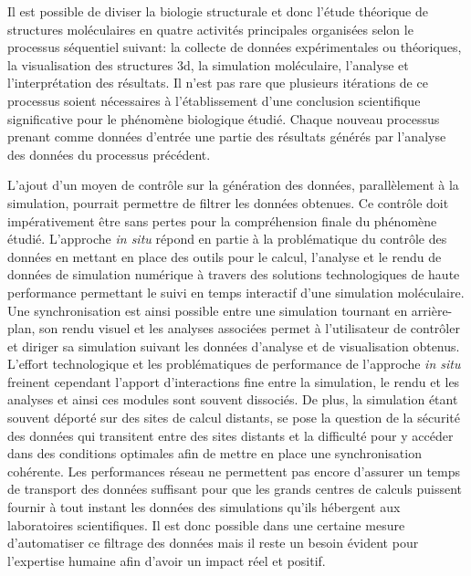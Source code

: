 Il est possible de diviser la biologie structurale et donc l'étude théorique de structures moléculaires en quatre activités principales organisées selon le processus séquentiel suivant: la collecte de données expérimentales ou théoriques, la visualisation des structures 3d, la simulation moléculaire, l’analyse et l’interprétation des résultats. Il n'est pas rare que plusieurs itérations de ce processus soient nécessaires à l'établissement d'une conclusion scientifique significative pour le phénomène biologique étudié. Chaque nouveau processus prenant comme données d'entrée une partie des résultats générés par l'analyse des données du processus précédent.  

L'ajout d'un moyen de contrôle sur la génération des données, parallèlement à la simulation, pourrait permettre de filtrer les données obtenues. Ce contrôle doit impérativement être sans pertes pour la compréhension finale du phénomène étudié. L'approche \textit{in situ} répond en partie à la problématique du contrôle des données en mettant en place des outils pour le calcul, l'analyse et le rendu de données de simulation numérique à travers des solutions technologiques de haute performance permettant le suivi en temps interactif d'une simulation moléculaire. Une synchronisation est ainsi possible entre une simulation tournant en arrière-plan, son rendu visuel et les analyses associées permet à l'utilisateur de contrôler et diriger sa simulation suivant les données d'analyse et de visualisation obtenus. L'effort technologique et les problématiques de performance de l'approche \textit{in situ} freinent cependant l'apport d'interactions fine entre la simulation, le rendu et les analyses et ainsi ces modules sont souvent dissociés. De plus, la simulation étant souvent déporté sur des sites de calcul distants, se pose la question de la sécurité des données qui transitent entre des sites distants et la difficulté pour y accéder dans des conditions optimales afin de mettre en place une synchronisation cohérente. Les performances réseau ne permettent pas encore d'assurer un temps de transport des données suffisant pour que les grands centres de calculs puissent fournir à tout instant les données des simulations qu'ils hébergent aux laboratoires scientifiques.
Il est donc possible dans une certaine mesure d'automatiser ce filtrage des données mais il reste un besoin évident pour l'expertise humaine afin d'avoir un impact réel et positif. 


